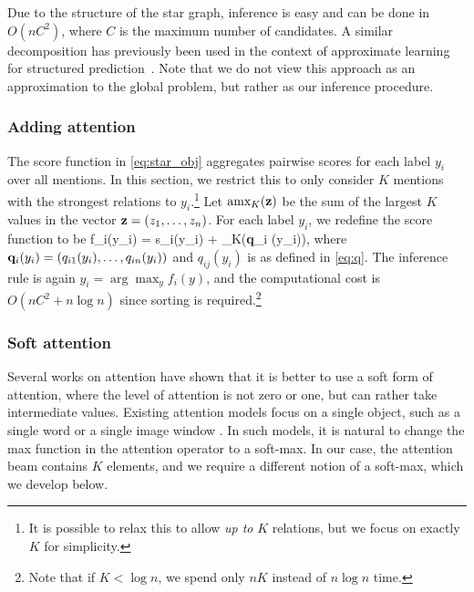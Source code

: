 Due to the structure of the star graph, inference is easy and can be done in $O(nC^2)$, where $C$ is the maximum number of candidates. A similar decomposition has previously been used in the context of approximate learning for structured prediction~\cite{SontagNIPS10}. 
Note that we do not view this approach as an approximation to the global problem, but rather as our inference procedure.

 

\subsubsection{Adding attention \label{sec:add_attention}}
The score function in \eqref{eq:star_obj} aggregates pairwise scores for each label $y_i$ over all mentions. In this section, we restrict this to only consider $K$ mentions with the strongest relations to $y_i$.\footnote{It is possible to relax this to allow {\em up to} $K$ relations, but we focus on exactly $K$ for simplicity.} 
  Let $\text{amx}_K({\bf z})$  be the sum of the largest $K$ values in the vector
${\bf z} = (z_1,\ldots,z_n)$.  For each label $y_i$,
we redefine the score function to be
\be
f_i(y_i) = s_i(y_i) + \amax_K({\bf q}_i (y_i)),
\label{eq:amax_obj}
\ee
where ${\bf q}_i(y_i) = (q_{i1}(y_i), \ldots, q_{in}(y_i))$ and $q_{ij}(y_i)$ is as defined in \eqref{eq:q}.
The inference rule is again $y_i = \arg\max_y f_i(y)$, and the computational cost is $O(nC^2+ n\log{n})$ since sorting is required.\footnote{Note that if $K < \log{n}$, we spend only $nK$ instead of $n\log{n}$ time.}


\subsubsection{Soft attention}
\label{sec:soft_attention}

Several works on attention have shown that it is better to use a soft form of attention, where the level of attention is not zero or one, but can rather take intermediate values. Existing attention models focus on a single object, such as a single word \cite{bahdanau2014neural} or a single image window \cite{xu2015show}. In such models,
 it is natural to change the max function in the attention operator to a soft-max. In our case, the attention beam contains $K$ elements, and we require a different notion of a soft-max, which we develop below.

